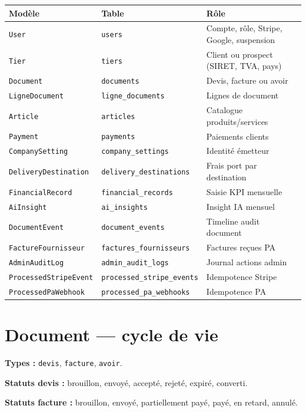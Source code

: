 \documentclass[11pt,a4paper]{report}
\begin{document}
\begin{longtable}{@{}p{3.2cm}p{3cm}p{7.3cm}@{}}
\toprule
\textbf{Modèle} & \textbf{Table} & \textbf{Rôle} \\
\midrule
\endhead
\texttt{User} & \texttt{users} & Compte, rôle, Stripe, Google, suspension \\
\texttt{Tier} & \texttt{tiers} & Client ou prospect (SIRET, TVA, pays) \\
\texttt{Document} & \texttt{documents} & Devis, facture ou avoir \\
\texttt{LigneDocument} & \texttt{ligne\_documents} & Lignes de document \\
\texttt{Article} & \texttt{articles} & Catalogue produits/services \\
\texttt{Payment} & \texttt{payments} & Paiements clients \\
\texttt{CompanySetting} & \texttt{company\_settings} & Identité émetteur \\
\texttt{DeliveryDestination} & \texttt{delivery\_destinations} & Frais port par destination \\
\texttt{FinancialRecord} & \texttt{financial\_records} & Saisie KPI mensuelle \\
\texttt{AiInsight} & \texttt{ai\_insights} & Insight IA mensuel \\
\texttt{DocumentEvent} & \texttt{document\_events} & Timeline audit document \\
\texttt{FactureFournisseur} & \texttt{factures\_fournisseurs} & Factures reçues PA \\
\texttt{AdminAuditLog} & \texttt{admin\_audit\_logs} & Journal actions admin \\
\texttt{ProcessedStripeEvent} & \texttt{processed\_stripe\_events} & Idempotence Stripe \\
\texttt{ProcessedPaWebhook} & \texttt{processed\_pa\_webhooks} & Idempotence PA \\
\bottomrule
\end{longtable}

\section{Document — cycle de vie}

\textbf{Types :} \texttt{devis}, \texttt{facture}, \texttt{avoir}.

\textbf{Statuts devis :} brouillon, envoyé, accepté, rejeté, expiré, converti.

\textbf{Statuts facture :} brouillon, envoyé, partiellement payé, payé, en retard, annulé.
\end{document}
